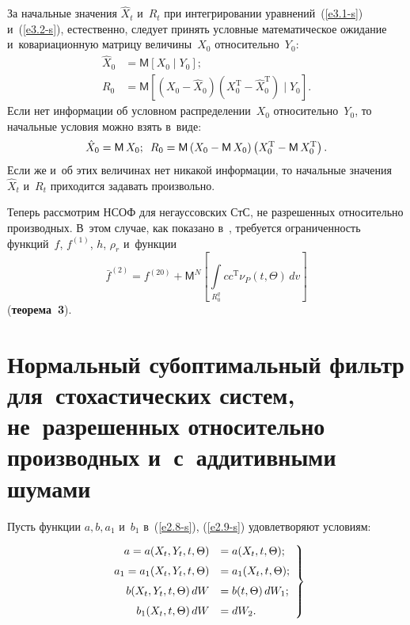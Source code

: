 \begin{multicols}{2}
За начальные значения $\hat X_t$ и~$R_t$  при интегрировании
уравнений~(\ref{e3.1-s}) и~(\ref{e3.2-s}), естественно, следует принять
условные математическое ожидание и~ковариационную матрицу величины~$X_0$ относительно~$Y_0$:
\begin{align*}
\hat X_0 &= \mathsf{M}\left[ X_0 \mid Y_0\right];\\
R_0 &= \mathsf{M} \left[ \left(X_0 -\hat X_0\right) 
\left(X_0^{\mathrm{T}} -\hat X_0^{\mathrm{T}}\right)\mid Y_0\right].
\end{align*}
 Если нет
информации об условном распределении~$X_0$ относительно~$Y_0$, то
начальные условия можно взять в~виде:
$$
\hat X_0 = \mathsf{M}\,X_0;\enskip
R_0= \mathsf{M}\left(X_0-\mathsf{M}\,X_0\right) \left(X_0^{\mathrm{T}}- \mathsf{M}\,X_0^{\mathrm{T}}\right). 
$$
Если
же и~об этих величинах нет никакой информации, то начальные
значения~$\hat X_t$ и~$R_t$ приходится задавать произвольно.

Теперь рассмотрим НСОФ для негауссовских СтС, не разрешенных относительно производных. 
В~этом случае, как показано в~\cite{10-s}, требуется ограниченность функций~$f$, $f^{(1)}$, $h$, $\rho_r$ 
и~функции
\begin{equation*}
\bar f^{(2)} = f^{(20)} + \mathsf{M}^N \left[ \int\limits_{R_0^q} cc^{\mathrm{T}} \nu_P (t,\Theta) \,dv\right]
 \end{equation*}
(\textbf{теорема~3}).



\section{Нормальный субоптимальный фильтр для~стохастических систем, 
не~разрешенных относительно производных  и~с~аддитивными шумами}


Пусть  функции $a,b, a_1$ и~$b_1$ в~(\ref{e2.8-s}), (\ref{e2.9-s}) удовлетворяют условиям:

\vspace*{4pt}

\noindent
\begin{equation}
\left.
\begin{array}{rl}
a = a(X_t, Y_t, t,\Theta)&=a (X_t, t,\Theta);\\[6pt]
 a_1 =a_1(X_t, Y_t, t,\Theta) &=a_1 (X_t, t,\Theta);
\\[6pt]
b(X_t, Y_t, t,\Theta) \,dW &=b(t,\Theta) \,dW_1;\\[6pt]
 b_1 (X_t, t,\Theta) \,dW &= dW_2.
 \end{array}
 \right\}
 \label{e4.1-s}
\end{equation}


\end{multicols}
